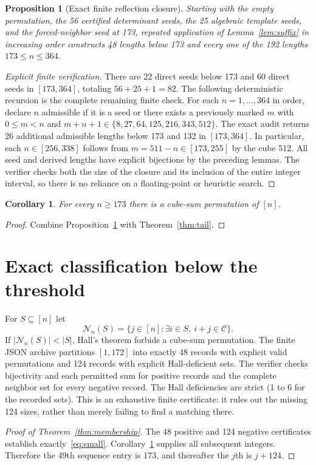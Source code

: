 \documentclass[9pt]{extarticle}
\newtheorem{proposition}[theorem]{Proposition}
\newtheorem{corollary}[theorem]{Corollary}
\newcommand{\C}{\mathcal C}
\begin{document}
\begin{proposition}[Exact finite reflection closure]\label{prop:closure}
Starting with the empty permutation, the 56 certified determinant seeds, the 25 algebraic template seeds, and the forced-neighbor seed at 173, repeated application of Lemma~\ref{lem:suffix} in increasing order constructs 48 lengths below 173 and \emph{every} one of the 192 lengths $173\le n\le364$.
\end{proposition}
\begin{proof}[Explicit finite verification]
There are 22 direct seeds below 173 and 60 direct seeds in $[173,364]$, totaling $56+25+1=82$. The following deterministic recursion is the complete remaining finite check. For each $n=1,\ldots,364$ in order, declare $n$ admissible if it is a seed or there exists a previously marked $m$ with $0\le m<n$ and $m+n+1\in\{8,27,64,125,216,343,512\}$. The exact audit returns 26 additional admissible lengths below 173 and 132 in $[173,364]$. In particular, each $n\in[256,338]$ follows from $m=511-n\in[173,255]$ by the cube 512. All seed and derived lengths have explicit bijections by the preceding lemmas. The verifier checks both the size of the closure and its inclusion of the entire integer interval, so there is no reliance on a floating-point or heuristic search.
\end{proof}
\begin{corollary}\label{cor:existence}
For every $n\ge173$ there is a cube-sum permutation of $[n]$.
\end{corollary}
\begin{proof}
Combine Proposition~\ref{prop:closure} with Theorem~\ref{thm:tail}.
\end{proof}

\section{Exact classification below the threshold}\label{sec:small}
For $S\subseteq[n]$ let
\[\mathcal N_n(S)=\{j\in[n]:\exists i\in S,\ i+j\in\C\}.\]
If $|\mathcal N_n(S)|<|S|$, Hall's theorem \cite{hall} forbids a cube-sum permutation. The finite JSON archive  partitions $[1,172]$ into exactly 48 records with explicit valid permutations and 124 records with explicit Hall-deficient sets. The verifier checks bijectivity and each permitted sum for positive records and the complete neighbor set for every negative record. The Hall deficiencies are strict (1 to 6 for the recorded sets). This is an exhaustive finite certificate: it rules out the missing 124 sizes, rather than merely failing to find a matching there.
\begin{proof}[Proof of Theorem~\ref{thm:membership}]
The 48 positive and 124 negative certificates establish exactly~\eqref{eq:small}. Corollary~\ref{cor:existence} supplies all subsequent integers. Therefore the 49th sequence entry is 173, and thereafter the $j$th is $j+124$.
\end{proof}
\end{document}
